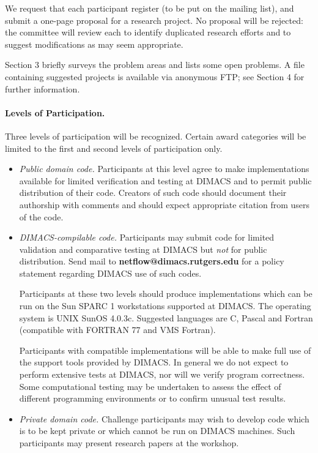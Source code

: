 We request that each participant register (to be put on the mailing list), 
and submit a one-page proposal for a research project. 
No proposal will be  rejected:  the committee will review each 
to identify duplicated research efforts and to suggest 
modifications as may seem appropriate.  

Section 3 briefly surveys the problem areas and lists some open problems. 
A file containing suggested projects is available via 
anonymous FTP; see Section 4 for further information. 

\paragraph{Levels of Participation.}

Three levels of participation will be recognized. Certain award 
categories will be limited to the first and second levels of 
participation only. 

\begin{itemize}
\item {\em Public domain code.}  Participants at this level 
agree to make implementations available for limited verification and testing 
at DIMACS and to permit public distribution of their code.
Creators of such code should document their authorship with 
comments and should expect appropriate citation from users
of the code. 

\item {\em DIMACS-compilable code.} Participants may submit code for
limited validation and comparative testing at DIMACS but {\em not} for 
public distribution.  
Send mail to {\bf netflow@dimacs.rutgers.edu} for a policy statement
regarding DIMACS use of such codes. 

Participants at these two levels should
produce implementations which can be run on the Sun SPARC 1 workstations
supported at DIMACS.  The operating system is UNIX SunOS 4.0.3c.  
Suggested languages are C, Pascal and Fortran (compatible with FORTRAN 77
and VMS Fortran). 

Participants with compatible implementations will be able to make full
use of the support tools provided by DIMACS.  In general we do not 
expect to perform extensive tests at DIMACS, nor will we verify 
program correctness.  Some computational testing may be undertaken 
to assess the effect of different programming environments or 
to confirm unusual test results.  

\item {\em Private domain code.} Challenge participants may wish to develop 
code which is to be kept private or which cannot be run on DIMACS
machines. Such participants may present research papers at the
workshop.
\end{itemize}

